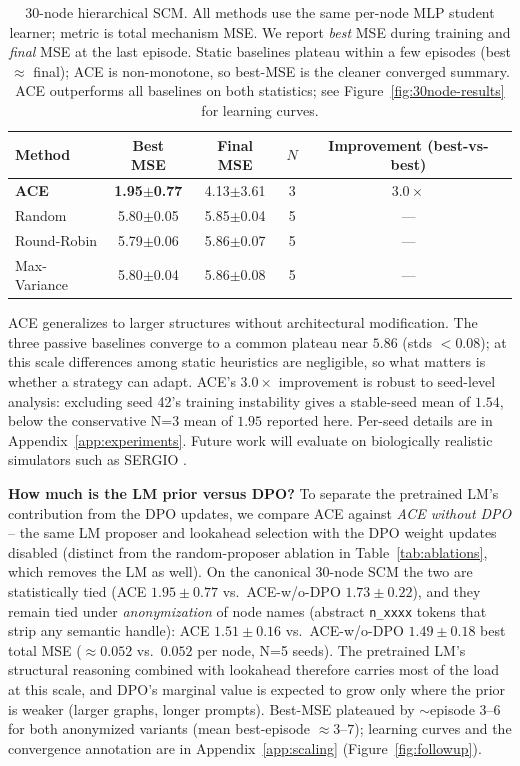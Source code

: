 \documentclass{article}
\theoremstyle{plain}
\theoremstyle{definition}
\theoremstyle{remark}
\begin{document}
\begin{table}[t]
\centering
\caption{30-node hierarchical SCM. All methods use the same per-node MLP student learner; metric is total mechanism MSE. We report \emph{best} MSE during training and \emph{final} MSE at the last episode. Static baselines plateau within a few episodes (best $\approx$ final); ACE is non-monotone, so best-MSE is the cleaner converged summary. ACE outperforms all baselines on both statistics; see Figure~\ref{fig:30node-results} for learning curves.}
\label{tab:large-scale}
\small
\begin{tabular}{@{}lcccc@{}}
\toprule
Method & Best MSE & Final MSE & $N$ & Improvement (best-vs-best) \\
\midrule
\textbf{ACE} & \textbf{1.95$\pm$0.77} & 4.13$\pm$3.61 & 3 & $3.0\times$ \\
\midrule
Random       & 5.80$\pm$0.05 & 5.85$\pm$0.04 & 5 & --- \\
Round-Robin  & 5.79$\pm$0.06 & 5.86$\pm$0.07 & 5 & --- \\
Max-Variance & 5.80$\pm$0.04 & 5.86$\pm$0.08 & 5 & --- \\
\bottomrule
\end{tabular}
\end{table}

ACE generalizes to larger structures without architectural modification. The three passive baselines converge to a common plateau near $5.86$ (stds $<\!0.08$); at this scale differences among static heuristics are negligible, so what matters is whether a strategy can adapt. ACE's $3.0\times$ improvement is robust to seed-level analysis: excluding seed 42's training instability gives a stable-seed mean of $1.54$, below the conservative N=3 mean of $1.95$ reported here. Per-seed details are in Appendix~\ref{app:experiments}. Future work will evaluate on biologically realistic simulators such as SERGIO \citep{dibaeinia2020sergio}.

\textbf{How much is the LM prior versus DPO?} To separate the pretrained LM's contribution from the DPO updates, we compare ACE against \emph{ACE without DPO} -- the same LM proposer and lookahead selection with the DPO weight updates disabled (distinct from the random-proposer ablation in Table~\ref{tab:ablations}, which removes the LM as well). On the canonical 30-node SCM the two are statistically tied (ACE $1.95\pm0.77$ vs.\ ACE-w/o-DPO $1.73\pm0.22$), and they remain tied under \emph{anonymization} of node names (abstract \texttt{n\_xxxx} tokens that strip any semantic handle): ACE $1.51\pm0.16$ vs.\ ACE-w/o-DPO $1.49\pm0.18$ best total MSE ($\approx\!0.052$ vs.\ $0.052$ per node, N=5 seeds). The pretrained LM's structural reasoning combined with lookahead therefore carries most of the load at this scale, and DPO's marginal value is expected to grow only where the prior is weaker (larger graphs, longer prompts). Best-MSE plateaued by $\sim$episode 3--6 for both anonymized variants (mean best-episode $\approx\!3$--$7$); learning curves and the convergence annotation are in Appendix~\ref{app:scaling} (Figure~\ref{fig:followup}).
\end{document}

